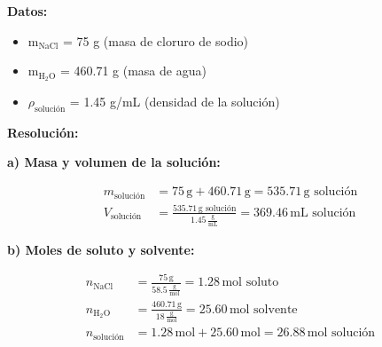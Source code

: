 \documentclass{article}
\begin{document}
\begin{multicols}{2} %
\noindent\textbf{Datos:} %


\textbf{} %
\begin{itemize}
\item m$_{\text{NaCl}}$ = 75 g (masa de cloruro de sodio)
\item m$_{\text{H}_2\text{O}}$ = 460.71 g (masa de agua)
\item $\rho_{\text{solución}}$ = 1.45 g/mL (densidad de la solución)
\end{itemize}

\columnbreak %

\noindent\textbf{Resolución:} %

\textbf{a) Masa y volumen de la solución:}

\begin{align*}
    m_{\text{solución}} &= 75 \, \text{g} + 460.71 \, \text{g} = 535.71 \, \text{g solución} \\[10pt]
    V_{\text{solución}} &= \frac{535.71 \, \text{g solución}}{1.45 \, \frac{\text{g}}{\text{mL}}} = 369.46 \, \text{mL solución}
\end{align*}

\textbf{b) Moles de soluto y solvente:}

\begin{align*}
    n_{\text{NaCl}} &= \frac{75 \, \text{g}}{58.5 \, \frac{\text{g}}{\text{mol}}} = 1.28 \, \text{mol soluto} \\[10pt]
    n_{\text{H}_2\text{O}} &= \frac{460.71 \, \text{g}}{18 \, \frac{\text{g}}{\text{mol}}} = 25.60 \, \text{mol solvente} \\[10pt]
    n_{\text{solución}} &= 1.28 \, \text{mol} + 25.60 \, \text{mol} = 26.88 \, \text{mol solución}
\end{align*}

\end{multicols} %
\end{document}
